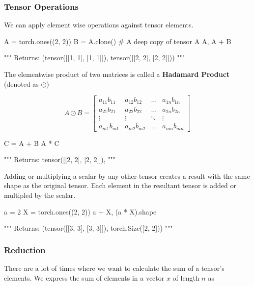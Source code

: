\documentclass[12pt]{article}
\begin{document}
\subsubsection{Tensor Operations}
We can apply element wise operations against tensor elements.

\vspace{6pt}
\begin{python}
A = torch.ones((2, 2))
B = A.clone() # A deep copy of tensor A
A, A + B

"""
Returns:
  (tensor([[1, 1], 
    [1, 1]]),
  tensor([[2, 2],
    [2, 2]]))
"""
\end{python}
\vspace{6pt}

The elementwise product of two matrices is called a \textbf{Hadamard Product} (denoted as $\odot$)

$$
A \odot B = \begin{bmatrix}
  a_{11}b_{11} & a_{12}b_{12} & \hdots & a_{1n}b_{1n} \\
  a_{21}b_{21} & a_{22}b_{22} & \hdots & a_{2n}b_{2n} \\
  \vdots & \vdots & \ddots & \vdots \\
  a_{m1}b_{m1} & a_{m2}b_{m2} & \hdots & a_{mn}b_{mn}
\end{bmatrix}
$$

\vspace{6pt}
\begin{python}
C = A + B
A * C

"""
Returns:
  tensor([[2, 2], 
    [2, 2]]),
"""
\end{python}
\vspace{6pt}

Adding or multiplying a scalar by any other tensor creates a result with the same shape as the original tensor.  Each element in the resultant tensor is added or multipled by the scalar.

\vspace{6pt}
\begin{python}
a = 2
X = torch.ones((2, 2))
a + X, (a * X).shape

"""
Returns:
  (tensor([[3, 3],
    [3, 3]]),
  torch.Size([2, 2]))
"""
\end{python}
\vspace{6pt}

\subsubsection{Reduction}
There are a lot of times where we want to calculate the sum of a tensor's elements.  We express the sum of elements in a vector $x$ of length $n$ as
\end{document}
